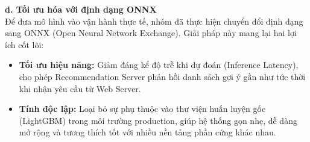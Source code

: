 \textbf{d. Tối ưu hóa với định dạng ONNX}\\
\indent Để đưa mô hình vào vận hành thực tế, nhóm đã thực hiện chuyển đổi định dạng sang ONNX (Open Neural Network Exchange). Giải pháp này mang lại hai lợi ích cốt lõi:
\begin{itemize}
    \item[-] \textbf{Tối ưu hiệu năng:} Giảm đáng kể độ trễ khi dự đoán (Inference Latency), cho phép Recommendation Server phản hồi danh sách gợi ý gần như tức thời khi nhận yêu cầu từ Web Server.
    \item[-] \textbf{Tính độc lập:} Loại bỏ sự phụ thuộc vào thư viện huấn luyện gốc (LightGBM) trong môi trường production, giúp hệ thống gọn nhẹ, dễ dàng mở rộng và tương thích tốt với nhiều nền tảng phần cứng khác nhau.
\end{itemize}

